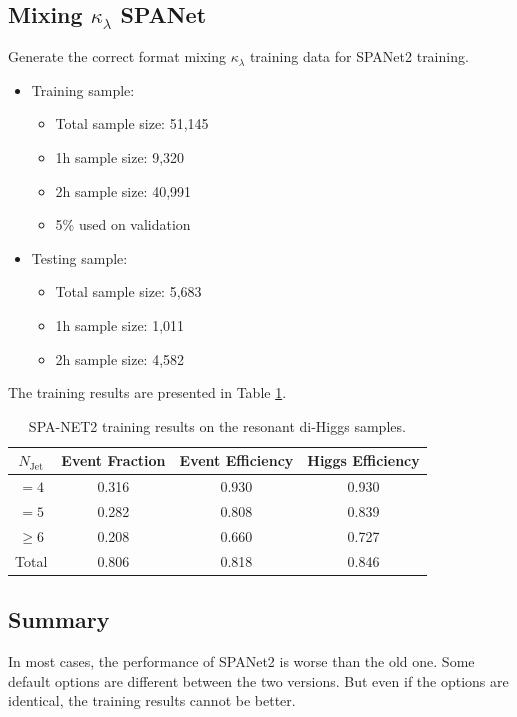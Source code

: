 \documentclass[12pt]{article}
\begin{document}
	\subsection{Mixing \texorpdfstring{$\kappa_\lambda$}{kappa} SPANet}%
	\label{sub:mixing_kappa_spanet}
		Generate the correct format mixing $\kappa_\lambda$ training data for SPANet2 training.
		\begin{itemize}
			\item Training sample:
			\begin{itemize}
				\item Total sample size: 51,145
				\item 1h sample size: 9,320
				\item 2h sample size: 40,991
				\item 5\% used on validation
			\end{itemize}
			\item Testing sample:
			\begin{itemize}
				\item Total sample size: 5,683
				\item 1h sample size: 1,011
				\item 2h sample size: 4,582
			\end{itemize}
		\end{itemize}
		The training results are presented in Table \ref{tab:SPANet2_diHiggs_4btag_DL1r_pt40_mix}.
		\begin{table}[htpb]
			\centering
			\caption{SPA-NET2 training results on the resonant di-Higgs samples.}
			\label{tab:SPANet2_diHiggs_4btag_DL1r_pt40_mix}
			\begin{tabular}{c|c|cc}
				$N_\text{Jet}$ & Event Fraction & Event Efficiency & Higgs Efficiency \\
				\hline
				$=4$	  &   0.316             &    0.930              &    0.930             \\
				$=5$	  &   0.282             &    0.808              &    0.839             \\
				$\ge 6$	  &   0.208             &    0.660              &    0.727             \\
				Total	  &   0.806             &    0.818              &    0.846             \\
			\end{tabular}
		\end{table}

		
	\subsection{Summary}%
	\label{sub:summary}
		In most cases, the performance of SPANet2 is worse than the old one. Some default options are different between the two versions. But even if the options are identical, the training results cannot be better.
\end{document}
